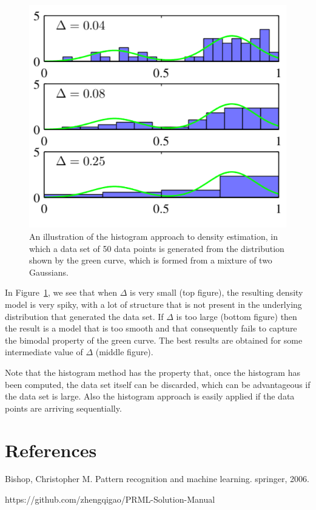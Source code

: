 \documentclass[5p,sort&compress]{elsarticle}
\begin{document}
\begin{figure}
     \centering
     \includegraphics[width = \linewidth]{figure/fig2-24.png}
     \caption{An illustration of the histogram approach to density estimation, in which a data set of 50 data points is generated from the distribution shown by the green curve, which is formed from a mixture of two Gaussians.}
     \label{fig:2.24}
\end{figure}

In Figure~\ref{fig:2.24}, we see that when $\Delta$ is very small (top figure), the resulting density model is very spiky, with a lot of structure that is not present in the underlying distribution that generated the data set. If $\Delta$ is too large (bottom figure) then the result is a model that is too smooth and that consequently fails to capture the bimodal property of the green curve. The best results are obtained for some intermediate value of $\Delta$ (middle figure).

Note that the histogram method has the property that, once the histogram has been computed, the data set itself can be discarded, which can be advantageous if the data set is large. Also the histogram approach is easily applied if the data points are arriving sequentially.


\section*{References}


\begin{thebibliography}{9}

Bishop, Christopher M. Pattern recognition and machine learning. springer, 2006.

https://github.com/zhengqigao/PRML-Solution-Manual


\end{thebibliography}
\end{document}
